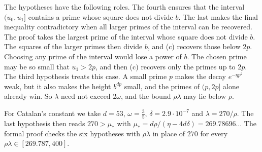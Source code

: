 \documentclass[11pt]{amsart}
\newcommand{\Mustar}{269.78696}
\theoremstyle{definition}
\theoremstyle{remark}
\numberwithin{equation}{section}
\begin{document}
The hypotheses have the following roles. The fourth ensures that the interval $(u_0,u_1]$ contains a prime
whose square does not divide $b$. The last makes the final inequality contradictory when all larger primes
of the interval can be recovered. The proof takes the largest prime of the interval whose square does not
divide $b$. The squares of the larger primes then divide $b$, and (c) recovers those below $2p$. Choosing
any prime of the interval would lose a power of $b$. The chosen prime may be so small that $u_1>2p$, and then
(c) recovers only the primes up to $2p$. The third hypothesis treats this case. A small prime $p$ makes the
decay $e^{-\eta p^2}$ weak, but it also makes the height $b^{dp}$ small, and the primes of $(p,2p]$ alone
already win. So $\lambda$ need not exceed $2\omega$, and the bound $\rho\lambda$ may lie below $\rho$.

For Catalan's constant we take $d=53$, $\omega=\frac35$, $\delta=2.9\cdot10^{-7}$ and $\lambda=270/\rho$.
The last hypothesis then reads $270>\mu_*$ with $\mu_*=d\rho/(\eta-4d\delta)=\Mustar\ldots$ The formal proof
checks the six hypotheses with $\rho\lambda$ in place of $270$ for every $\rho\lambda\in[269.787,400]$.








\appendix




\end{document}
